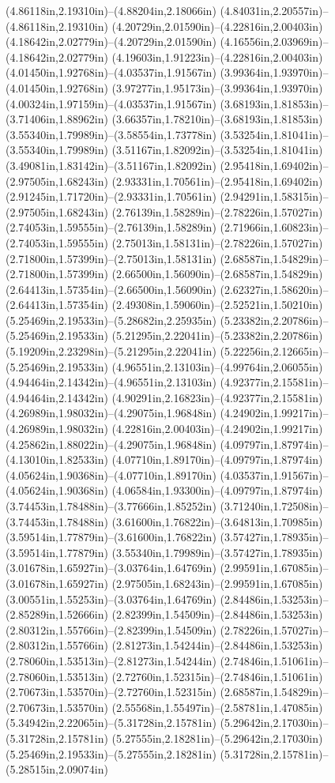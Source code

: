 (4.86118in,2.19310in)--(4.88204in,2.18066in) (4.84031in,2.20557in)--(4.86118in,2.19310in) (4.20729in,2.01590in)--(4.22816in,2.00403in) (4.18642in,2.02779in)--(4.20729in,2.01590in) (4.16556in,2.03969in)--(4.18642in,2.02779in) (4.19603in,1.91223in)--(4.22816in,2.00403in) (4.01450in,1.92768in)--(4.03537in,1.91567in) (3.99364in,1.93970in)--(4.01450in,1.92768in) (3.97277in,1.95173in)--(3.99364in,1.93970in) (4.00324in,1.97159in)--(4.03537in,1.91567in) (3.68193in,1.81853in)--(3.71406in,1.88962in) (3.66357in,1.78210in)--(3.68193in,1.81853in) (3.55340in,1.79989in)--(3.58554in,1.73778in) (3.53254in,1.81041in)--(3.55340in,1.79989in) (3.51167in,1.82092in)--(3.53254in,1.81041in) (3.49081in,1.83142in)--(3.51167in,1.82092in) (2.95418in,1.69402in)--(2.97505in,1.68243in) (2.93331in,1.70561in)--(2.95418in,1.69402in) (2.91245in,1.71720in)--(2.93331in,1.70561in) (2.94291in,1.58315in)--(2.97505in,1.68243in) (2.76139in,1.58289in)--(2.78226in,1.57027in) (2.74053in,1.59555in)--(2.76139in,1.58289in) (2.71966in,1.60823in)--(2.74053in,1.59555in) (2.75013in,1.58131in)--(2.78226in,1.57027in) (2.71800in,1.57399in)--(2.75013in,1.58131in) (2.68587in,1.54829in)--(2.71800in,1.57399in) (2.66500in,1.56090in)--(2.68587in,1.54829in) (2.64413in,1.57354in)--(2.66500in,1.56090in) (2.62327in,1.58620in)--(2.64413in,1.57354in) (2.49308in,1.59060in)--(2.52521in,1.50210in) (5.25469in,2.19533in)--(5.28682in,2.25935in) (5.23382in,2.20786in)--(5.25469in,2.19533in) (5.21295in,2.22041in)--(5.23382in,2.20786in) (5.19209in,2.23298in)--(5.21295in,2.22041in) (5.22256in,2.12665in)--(5.25469in,2.19533in) (4.96551in,2.13103in)--(4.99764in,2.06055in) (4.94464in,2.14342in)--(4.96551in,2.13103in) (4.92377in,2.15581in)--(4.94464in,2.14342in) (4.90291in,2.16823in)--(4.92377in,2.15581in) (4.26989in,1.98032in)--(4.29075in,1.96848in) (4.24902in,1.99217in)--(4.26989in,1.98032in) (4.22816in,2.00403in)--(4.24902in,1.99217in) (4.25862in,1.88022in)--(4.29075in,1.96848in) (4.09797in,1.87974in)--(4.13010in,1.82533in) (4.07710in,1.89170in)--(4.09797in,1.87974in) (4.05624in,1.90368in)--(4.07710in,1.89170in) (4.03537in,1.91567in)--(4.05624in,1.90368in) (4.06584in,1.93300in)--(4.09797in,1.87974in) (3.74453in,1.78488in)--(3.77666in,1.85252in) (3.71240in,1.72508in)--(3.74453in,1.78488in) (3.61600in,1.76822in)--(3.64813in,1.70985in) (3.59514in,1.77879in)--(3.61600in,1.76822in) (3.57427in,1.78935in)--(3.59514in,1.77879in) (3.55340in,1.79989in)--(3.57427in,1.78935in) (3.01678in,1.65927in)--(3.03764in,1.64769in) (2.99591in,1.67085in)--(3.01678in,1.65927in) (2.97505in,1.68243in)--(2.99591in,1.67085in) (3.00551in,1.55253in)--(3.03764in,1.64769in) (2.84486in,1.53253in)--(2.85289in,1.52666in) (2.82399in,1.54509in)--(2.84486in,1.53253in) (2.80312in,1.55766in)--(2.82399in,1.54509in) (2.78226in,1.57027in)--(2.80312in,1.55766in) (2.81273in,1.54244in)--(2.84486in,1.53253in) (2.78060in,1.53513in)--(2.81273in,1.54244in) (2.74846in,1.51061in)--(2.78060in,1.53513in) (2.72760in,1.52315in)--(2.74846in,1.51061in) (2.70673in,1.53570in)--(2.72760in,1.52315in) (2.68587in,1.54829in)--(2.70673in,1.53570in) (2.55568in,1.55497in)--(2.58781in,1.47085in) (5.34942in,2.22065in)--(5.31728in,2.15781in) (5.29642in,2.17030in)--(5.31728in,2.15781in) (5.27555in,2.18281in)--(5.29642in,2.17030in) (5.25469in,2.19533in)--(5.27555in,2.18281in) (5.31728in,2.15781in)--(5.28515in,2.09074in) 